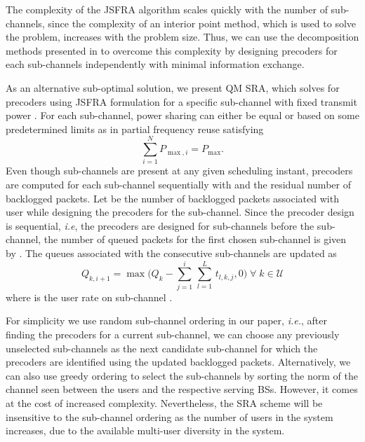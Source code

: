 The complexity of the \ac{JSFRA} algorithm scales quickly with the number of sub-channels, since the complexity of an interior point method, which is used to solve the problem, increases with the problem size. Thus, we can use the decomposition methods presented in \cite{palomar2006tutorial,boyd2011distributed} to overcome this complexity by designing precoders for each sub-channels independently with minimal information exchange.

As an alternative sub-optimal solution, we present \acl{QM} \ac{SRA}, which solves for precoders using \ac{JSFRA} formulation for a specific sub-channel  with fixed transmit power . For each sub-channel, power sharing can either be equal or based on some predetermined limits as in partial frequency reuse satisfying
\begin{equation}
\sum_{i=1}^N P_{\max,i} = P_{\max}.
\end{equation}
Even though  sub-channels are present at any given scheduling instant, precoders are computed for each sub-channel sequentially with  and the residual number of backlogged packets. Let  be the number of backlogged packets associated with user  while designing the precoders for the  sub-channel. Since the precoder design is sequential, \textit{i.e}, the precoders are designed for sub-channels \me{[0,i-1]} before the  sub-channel, the number of queued packets for the first chosen sub-channel is given by . The queues associated with the consecutive sub-channels are updated as
\begin{equation}	\label{eqn-weight}
Q_{k,i+1} = \max \Big ( Q_k - \sum_{j = 1}^{i} \, \sum_{l = 1}^{L} \, t_{l,k,j} ,0 \Big ) \; \forall \; k \in \mathcal{U}
\end{equation}
where  is the  user rate on sub-channel . 

For simplicity we use random sub-channel ordering in our paper, \textit{i.e.}, after finding the precoders for a current sub-channel, we can choose any previously unselected sub-channels as the next candidate sub-channel for which the precoders are identified using the updated backlogged packets. Alternatively, we can also use greedy ordering to select the sub-channels by sorting the norm of the channel seen between the users and the respective serving \acp{BS}. However, it comes at the cost of increased complexity. Nevertheless, the \ac{SRA} scheme will be insensitive to the sub-channel ordering as the number of users in the system increases, due to the available multi-user diversity in the system.


